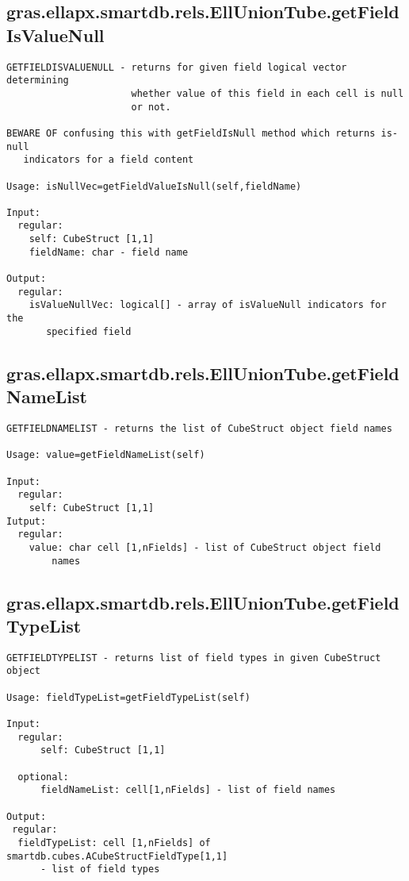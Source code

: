 \subsection{\texorpdfstring{gras.ellapx.smartdb.rels.EllUnionTube.getFieldIsValueNull}{getFieldIsValueNull}}\label{method:gras.ellapx.smartdb.rels.EllUnionTube.getFieldIsValueNull}
\begin{verbatim}
GETFIELDISVALUENULL - returns for given field logical vector determining
                      whether value of this field in each cell is null
                      or not.

BEWARE OF confusing this with getFieldIsNull method which returns is-null
   indicators for a field content

Usage: isNullVec=getFieldValueIsNull(self,fieldName)

Input:
  regular:
    self: CubeStruct [1,1]
    fieldName: char - field name

Output:
  regular:
    isValueNullVec: logical[] - array of isValueNull indicators for the
       specified field
\end{verbatim}
\subsection{\texorpdfstring{gras.ellapx.smartdb.rels.EllUnionTube.getFieldNameList}{getFieldNameList}}\label{method:gras.ellapx.smartdb.rels.EllUnionTube.getFieldNameList}
\begin{verbatim}
GETFIELDNAMELIST - returns the list of CubeStruct object field names

Usage: value=getFieldNameList(self)

Input:
  regular:
    self: CubeStruct [1,1]
Iutput:
  regular:
    value: char cell [1,nFields] - list of CubeStruct object field
        names
\end{verbatim}
\subsection{\texorpdfstring{gras.ellapx.smartdb.rels.EllUnionTube.getFieldTypeList}{getFieldTypeList}}\label{method:gras.ellapx.smartdb.rels.EllUnionTube.getFieldTypeList}
\begin{verbatim}
GETFIELDTYPELIST - returns list of field types in given CubeStruct object

Usage: fieldTypeList=getFieldTypeList(self)

Input:
  regular:
      self: CubeStruct [1,1]

  optional:
      fieldNameList: cell[1,nFields] - list of field names

Output:
 regular:
  fieldTypeList: cell [1,nFields] of smartdb.cubes.ACubeStructFieldType[1,1]
      - list of field types
\end{verbatim}
